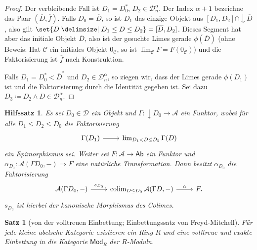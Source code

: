 \documentclass[a4paper, parskip=half]{scrartcl}
\theoremstyle{marginbreak}
\newtheorem{theorem}[remark]{Satz}
\newtheorem{lemma}[remark]{Hilfssatz}
\theoremstyle{nonumberplain}
\newtheorem{proof}{Beweis.}
\newcommand\ccat\mathsf
\newcommand\cat\mathcal
\newcommand{\down}[1]{{\downarrow}#1}
\DeclareMathOperator{\colim}{colim}
\begin{document}
{\begin{proof}
			Der verbleibende Fall ist $D_1=D_0^*$, $D_2\in\cat{D}_n^\alpha$. Der Index
			$\alpha + 1$ bezeichne das Paar $(\overline{D}, \overline{f})$. Falls
			$D_0 = \overline{D}$, so ist $D_1$ das einzige Objekt aus $[D_1, D_2]\cap\down{\overline{D}}$,
			also gilt $\set{D\given D_1\leq D\leq D_2}=[\overline{D}, D_2]$. Dieses Segment
			hat aber das initiale Objekt $\overline{D}$, also ist der gesuchte Limes gerade
			$\phi(\overline{D})$ (ohne Beweis: Hat $\cat{C}$ ein initiales Objekt $0_\cat{C}$, so ist
			$\lim_\cat{C} F = F(0_\cat{C})$) und die Faktorisierung ist $\overline{f}$ nach
			Konstruktion.

			Falls $D_1=D_0^*<\overline{D}^*$ und $D_2\in\cat{D}_n^\alpha$, so ziegen wir,
			dass der Limes gerade $\phi(D_1)$ ist und die Faktorisierung durch die Identität gegeben
			ist. Sei dazu $D_3\coloneqq D_2\wedge\overline{D}\in\cat{D}_n^\alpha$.
		\end{proof}}
		\begin{lemma}\label{func}
			Es sei $D_0\in\cat{D}$ ein Objekt und $\Gamma\colon \down{D_0}\to\cat{A}$
			ein Funktor, wobei für alle $D_1\leq D_2\leq D_0$ die Faktorisierung
			\[
				\begin{tikzcd}
					\Gamma(D_1) \arrow[r] & \lim_{D_1<D\leq D_2} \Gamma(D)
				\end{tikzcd}
			\]
			ein Epimorphismus sei. Weiter sei $F\colon\cat{A}\to\ccat{Ab}$ ein
			Funktor und $\alpha_{D_0}\colon \cat{A}(\Gamma D_0, {-})\Rightarrow F$
			eine natürliche Transformation. Dann besitzt $\alpha_{D_0}$ die
			Faktorisierung
			\[
				\begin{tikzcd}
					\cat{A}(\Gamma D_0, {-}) \arrow{r}{s_{D_0}} & \colim_{D\leq D_0}\cat{A}(\Gamma D, {-}) \arrow{r}{\alpha} & F.
				\end{tikzcd}
			\]
			$s_{D_0}$ ist hierbei der kanonische Morphismus des Colimes.
		\end{lemma}
		\begin{theorem}[von der volltreuen Einbettung; Einbettungssatz von Freyd-Mitchell]
			Für jede kleine abelsche Kategorie existieren ein Ring $R$ und eine volltreue
			und exakte Einbettung in die Kategorie $\ccat{Mod}_R$ der $R$-Moduln.
		\end{theorem}
\end{document}
